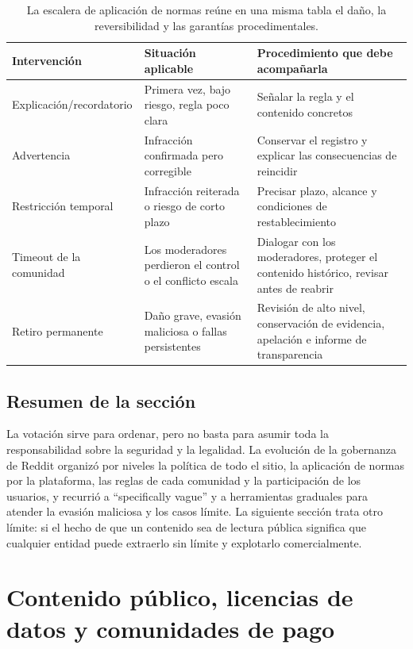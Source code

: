 \documentclass[a4paper]{article}
\begin{document}
\begin{table}[H]
\centering
\begin{tabular}{L{0.18\textwidth}L{0.27\textwidth}L{0.43\textwidth}}
\toprule
Intervención & Situación aplicable & Procedimiento que debe acompañarla \\
\midrule
Explicación/recordatorio & Primera vez, bajo riesgo, regla poco clara & Señalar la regla y el contenido concretos \\
Advertencia & Infracción confirmada pero corregible & Conservar el registro y explicar las consecuencias de reincidir \\
Restricción temporal & Infracción reiterada o riesgo de corto plazo & Precisar plazo, alcance y condiciones de restablecimiento \\
Timeout de la comunidad & Los moderadores perdieron el control o el conflicto escala & Dialogar con los moderadores, proteger el contenido histórico, revisar antes de reabrir \\
Retiro permanente & Daño grave, evasión maliciosa o fallas persistentes & Revisión de alto nivel, conservación de evidencia, apelación e informe de transparencia \\
\bottomrule
\end{tabular}
\caption{La escalera de aplicación de normas reúne en una misma tabla el daño, la reversibilidad y las garantías procedimentales.}
\end{table}

\subsection{Resumen de la sección}

La votación sirve para ordenar, pero no basta para asumir toda la responsabilidad sobre la seguridad y la legalidad. La evolución de la gobernanza de Reddit organizó por niveles la política de todo el sitio, la aplicación de normas por la plataforma, las reglas de cada comunidad y la participación de los usuarios, y recurrió a ``specifically vague'' y a herramientas graduales para atender la evasión maliciosa y los casos límite. La siguiente sección trata otro límite: si el hecho de que un contenido sea de lectura pública significa que cualquier entidad puede extraerlo sin límite y explotarlo comercialmente.
\section{Contenido público, licencias de datos y comunidades de pago}
\end{document}
